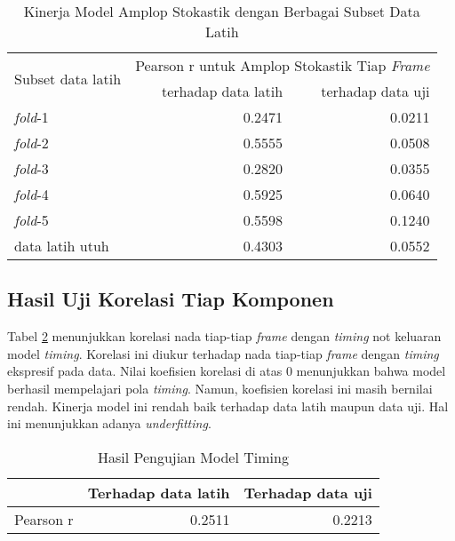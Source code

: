 \begin{table}[htbp]
    \centering
    \caption{Kinerja Model Amplop Stokastik dengan Berbagai Subset Data Latih}\label{tab-stoc-model-subset-results}
    \begin{tabular}{ |l|r|r| } 
     \hline
     \multirow{2}{*}{Subset data latih} & \multicolumn{2}{l|}{Pearson r untuk Amplop Stokastik Tiap \textit{Frame}} \\
     \cline{2-3}
     & terhadap data latih & terhadap data uji \\\hline
	\textit{fold}-1       &0.2471  &0.0211\\\hline
	\textit{fold}-2       &0.5555  &0.0508\\\hline
	\textit{fold}-3       &0.2820  &0.0355\\\hline
	\textit{fold}-4       &0.5925  &0.0640\\\hline
	\textit{fold}-5       &0.5598  &0.1240\\\hline
	data latih utuh       &0.4303  &0.0552\\\hline
    \end{tabular}
\end{table}


\subsection{Hasil Uji Korelasi Tiap Komponen}

Tabel \ref{tab-timing-testing-results} menunjukkan korelasi nada tiap-tiap \textit{frame} dengan \textit{timing} not keluaran model \textit{timing}. Korelasi ini diukur terhadap nada tiap-tiap \textit{frame} dengan \textit{timing} ekspresif pada data. Nilai koefisien korelasi di atas 0 menunjukkan bahwa model berhasil mempelajari pola \textit{timing}. Namun, koefisien korelasi ini masih bernilai rendah. Kinerja model ini rendah baik terhadap data latih maupun data uji. Hal ini menunjukkan adanya \textit{underfitting}.

\begin{table}[htbp]
    \centering
    \caption{Hasil Pengujian Model Timing}\label{tab-timing-testing-results}
    \begin{tabular}{ |l|r|r| } 
     \cline{2-3}
     \multicolumn{1}{l|}{}&Terhadap data latih&Terhadap data uji\\\hline
	 Pearson r&0.2511  &0.2213\\\hline
    \end{tabular}
\end{table}

